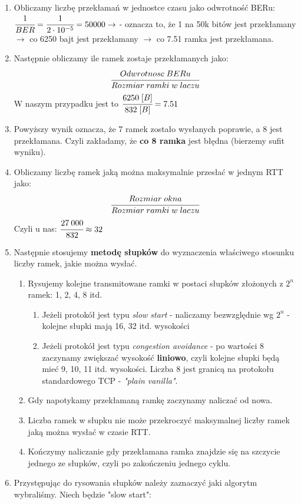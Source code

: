 			\begin{enumerate}
				\item Obliczamy liczbę przekłamań w jednostce czasu jako odwrotność BERu:
				$ \cfrac{1}{BER} = \cfrac{1}{2\cdot 10^{-5}}=50000 \rightarrow$ - oznacza to, że 1 na 50k bitów jest przekłamany $ \rightarrow $ co 6250 bajt jest przekłamany $ \rightarrow $ co 7.51 ramka jest przekłamana.
				\item Następnie obliczamy ile ramek zostaje przekłamanych jako:
				$$ \cfrac{Odwrotnosc\;BERu}{Rozmiar\;ramki\;w\;laczu} $$
				W naszym przypadku jest to $ \cfrac{6250\;[B]}{832\;[B]}=7.51$
				\item Powyższy wynik oznacza, że 7 ramek zostało wysłanych poprawie, a 8 jest przekłamana. Czyli zakładamy, że \textbf{co 8 ramka} jest błędna (bierzemy sufit wyniku).
				\item Obliczamy liczbę ramek jaką można maksymalnie przesłać w jednym RTT jako:
				$$ \cfrac{Rozmiar\;okna}{Rozmiar\;ramki\;w\;laczu} $$
				Czyli u nas: $ \cfrac{27\:000}{832}\approx32 $
				\item Następnie stosujemy \textbf{metodę słupków} do wyznaczenia właściwego stosunku liczby ramek, jakie można wysłać.
				\begin{enumerate}
					\item Rysujemy kolejne transmitowane ramki w postaci słupków złożonych z $ 2^n $ ramek: 1, 2, 4, 8 itd.
					\begin{enumerate}
						\item Jeżeli protokół jest typu \emph{slow start} - naliczamy bezwzględnie wg $ 2^n $ - kolejne słupki mają 16, 32 itd. wysokości
						\item Jeżeli protokół jest typu \emph{congestion avoidance} - po wartości 8 zaczynamy zwiększać wysokość \textbf{liniowo}, czyli kolejne słupki będą mieć 9, 10, 11 itd. wysokości. Liczba 8 jest granicą na protokołu standardowego TCP - \emph{"plain vanilla"}.
					\end{enumerate}
					\item Gdy napotykamy przekłamaną ramkę zaczynamy naliczać od nowa.
					\item Liczba ramek w słupku nie może przekroczyć maksymalnej liczby ramek jaką można wysłać w czasie RTT.
					\item Kończymy naliczanie gdy przekłamana ramka znajdzie się na szczycie jednego ze słupków, czyli po zakończeniu jednego cyklu.
				\end{enumerate}
				\item Przystępując do rysowania słupków należy zaznaczyć jaki algorytm wybraliśmy. Niech będzie "slow start":\\

\end{enumerate}
